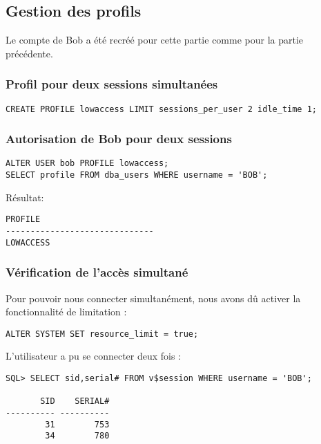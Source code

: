 \subsection{Gestion des profils}

Le compte de Bob a été recréé pour cette partie comme pour la partie précédente.

\subsubsection{Profil pour deux sessions simultanées}

\begin{verbatim}
CREATE PROFILE lowaccess LIMIT sessions_per_user 2 idle_time 1;
\end{verbatim}

\subsubsection{Autorisation de Bob pour deux sessions}

\begin{verbatim}
ALTER USER bob PROFILE lowaccess;
SELECT profile FROM dba_users WHERE username = 'BOB';
\end{verbatim}

Résultat:
\begin{verbatim}
PROFILE                                                                         
------------------------------                                                  
LOWACCESS                                                                       
\end{verbatim}

\subsubsection{Vérification de l’accès simultané}

Pour pouvoir nous connecter simultanément, nous avons dû activer la
fonctionnalité de limitation :
\begin{verbatim}
ALTER SYSTEM SET resource_limit = true;
\end{verbatim}

L’utilisateur a pu se connecter deux fois :
\begin{verbatim}
SQL> SELECT sid,serial# FROM v$session WHERE username = 'BOB';

       SID    SERIAL#                                                           
---------- ----------                                                           
        31        753                                                           
        34        780                                                           
\end{verbatim}
